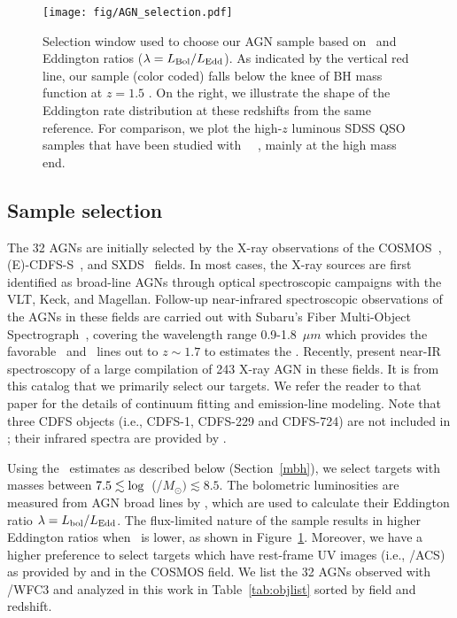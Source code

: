 \documentclass[apj]{emulateapj}
\begin{document}
\begin{figure}
\centering
{
\texttt{[image: fig/AGN\_selection.pdf]}
}
\caption{\label{fig:selection} Selection window used to choose our AGN sample based on  \mbh~and Eddington ratios ($\lambda = L_{\rm Bol}/L_{\rm Edd}$). As indicated by the vertical red line, our sample (color coded) falls below the knee of BH mass function at $z=1.5$ \citep[top panel,][]{Schulze2015}. On the right, we illustrate the shape of the Eddington rate distribution at these redshifts from the same reference. For comparison, we plot the high-$z$ luminous SDSS QSO samples that have been studied with \hst\ ~\citep[grey squares and circles from][respectively]{Peng2006a, Decarli2010}, mainly at the high mass end.}
\end{figure} 

\subsection{Sample selection}\label{sec:target_selection}

The 32 AGNs are initially selected by the X-ray observations of the COSMOS~\citep{Civano2016}, (E)-CDFS-S~\citep{Lehmer2005, Xue2011}, and SXDS~\citep{Ueda2008} fields. In most cases, the X-ray sources are first identified as broad-line AGNs through optical spectroscopic campaigns with the VLT, Keck, and Magellan. Follow-up near-infrared spectroscopic observations of the AGNs in these fields are carried out with Subaru's Fiber Multi-Object Spectrograph~\citep[FMOS, ][]{Kimura2010, Nobuta2012,Matsuoka2013}, covering the wavelength range 0.9-1.8~$\mu m$ which provides the favorable \halpha\ and \hbeta\ lines out to $z\sim1.7$ to estimates the \mbh. Recently, \citet{Schulze2018} present near-IR spectroscopy of a large compilation of 243 X-ray AGN in these fields. It is from this catalog that we primarily select our targets. We refer the reader to that paper for the details of continuum fitting and emission-line modeling. Note that three CDFS objects (i.e., CDFS-1, CDFS-229 and CDFS-724) are not included in \citet{Schulze2018}; their infrared spectra are provided by \citet{Suh2015}.

Using the \mbh\ estimates as described below (Section~\ref{mbh}), we select targets with masses between $7.5 \lesssim {\rm log}$~(\mbh/$M_{\odot})\lesssim8.5$. The bolometric luminosities are measured from AGN broad lines by \citet[][Section 3.3]{Schulze2018}, which are used to calculate their Eddington ratio $\lambda = L_{\rm bol}/L_{\rm Edd}$. The flux-limited nature of the sample results in higher Eddington ratios when \mbh\ is lower, as shown in Figure~\ref{fig:selection}. Moreover, we have a higher preference to select targets which have rest-frame UV images (i.e., \hst/ACS) as provided by \citet{Scoville2007} and \citet{Koekemoer2007} in the COSMOS field. We list the 32 AGNs observed with \hst/WFC3 and analyzed in this work in Table~\ref{tab:objlist} sorted by field and redshift.
\end{document}

